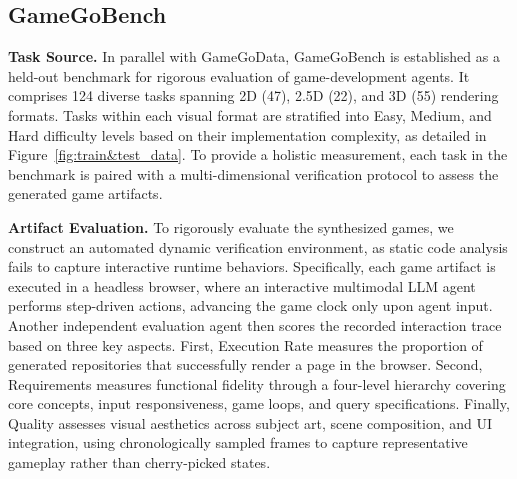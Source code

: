 \documentclass{article}
\begin{document}

\subsection{GameGoBench}
\textbf{Task Source.}
In parallel with GameGoData, GameGoBench is established as a held-out benchmark for rigorous evaluation of game-development agents. It comprises 124 diverse tasks spanning 2D (47), 2.5D (22), and 3D (55) rendering formats. Tasks within each visual format are stratified into Easy, Medium, and Hard difficulty levels based on their implementation complexity, as detailed in Figure~\ref{fig:train&test_data}. To provide a holistic measurement, each task in the benchmark is paired with a multi-dimensional verification protocol to assess the generated game artifacts.


\textbf{Artifact Evaluation.}
To rigorously evaluate the synthesized games, we construct an automated dynamic verification environment, as static code analysis fails to capture interactive runtime behaviors. Specifically, each game artifact is executed in a headless browser, where an interactive multimodal LLM agent performs step-driven actions, advancing the game clock only upon agent input. Another independent evaluation agent then scores the recorded interaction trace based on three key aspects. First, Execution Rate measures the proportion of generated repositories that successfully render a page in the browser. Second, Requirements measures functional fidelity through a four-level hierarchy covering core concepts, input responsiveness, game loops, and query specifications. Finally, Quality assesses visual aesthetics across subject art, scene composition, and UI integration, using chronologically sampled frames to capture representative gameplay rather than cherry-picked states.


\end{document}
